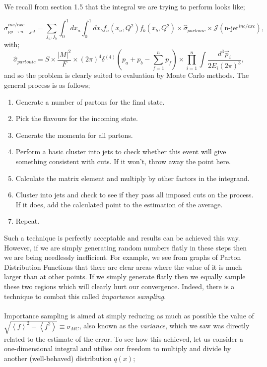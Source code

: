 We recall from section 1.5 that the integral we are trying to perform looks like;

\begin{equation}
\sigma_{pp \to n-jet}^{inc/exc} = \sum_{f_a, f_b} \int_0^1 dx_a \int_0^1 dx_b f_a(x_a, Q^2) f_b(x_b, Q^2) \times \hat{\sigma}_{partonic} \times \mathcal{J}(\text{n-jet}^{inc/exc}),
\end{equation}
with;
\begin{equation}
\hat{\sigma}_{partonic} = S \times \frac{|M|^2}{F} \times (2 \pi)^4 \delta^{(4)}(p_a + p_b - \sum_{f=1}^n p_f) \times \prod_{i=1}^n \int \frac{d^3 \vec{p}_i}{2 E_i (2 \pi)^3},
\end{equation}
and so the problem is clearly suited to evaluation by Monte Carlo methods. The general process is as follows;
\begin{enumerate} 
\item{Generate a number of partons for the final state.}
\item{Pick the flavours for the incoming state.}
\item{Generate the momenta for all partons.}
\item{Perform a basic cluster into jets to check whether this event will give something consistent with cuts. If it won't, throw away the point here.}
\item{Calculate the matrix element and multiply by other factors in the integrand.}
\item{Cluster into jets and check to see if they pass all imposed cuts on the process. If it does, add the calculated point to the estimation of the average.}
\item{Repeat.}

\end{enumerate}

Such a technique is perfectly acceptable and results can be achieved this way. However, if we are simply generating random numbers flatly in these steps then we are being needlessly inefficient. For example, we see from graphs of Parton Distribution Functions that there are clear areas where the value of it is much larger than at other points. If we simply generate flatly then we equally sample these two regions which will clearly hurt our convergence. Indeed, there is a technique to combat this called \emph{importance sampling}. \\
\\
Importance sampling is aimed at simply reducing as much as possible the value of $\sqrt{\left<f \right>^2 - \left<f^2 \right>} \equiv \sigma_{MC}$, also known as the \emph{variance}, which we saw was directly related to the estimate of the error. To see how this achieved, let us consider a one-dimensional integral and utilise our freedom to multiply and divide by another (well-behaved) distribution $q(x)$;

